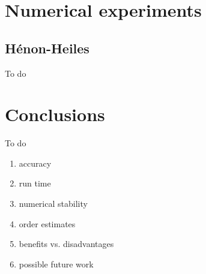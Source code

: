 \section{Numerical experiments}\label{sec:c3_experiments}

\subsection{Hénon-Heiles}\label{sec:c3_experiment_henon}

{\color{red} To do}

\section{Conclusions}

 {\color{red} To do}

\begin{enumerate}
    \item accuracy
    \item run time
    \item numerical stability
    \item order estimates
    \item benefits vs. disadvantages
    \item possible future work
\end{enumerate}


\stopchapter
